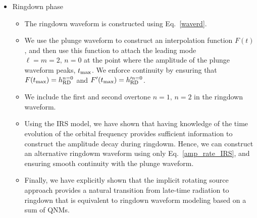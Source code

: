 \documentclass[aps,prd,showpacs,amssymb,floatfix,nofootinbib,superscriptaddress]{revtex4-1}%
\begin{document}
\begin{itemize}
\item{Ringdown phase}
\begin{itemize}
\item The ringdown waveform is constructed using Eq.~\eqref{waverd}.
\item We use the plunge waveform to construct an interpolation function \(F(t)\), and then use this function to attach the leading mode \(\ell=m=2,\, n=0\) at the point where the amplitude of the plunge waveform peaks, \(t_{\rm{max}}\). We enforce continuity by ensuring that \(F( t_{\rm{max}}) = h^{n=0}_{\rm{RD}}\) and  \(F'( t_{\rm{max}}) = h'^{n=0}_{\rm{RD}}\).
\item We include the first and second overtone \(n=1,\, n=2\) in the ringdown waveform.
\item  Using the IRS model, we have shown that having knowledge of the time evolution of the orbital frequency provides sufficient information to construct the amplitude decay during ringdowm. Hence, we can construct an alternative ringdowm waveform using only Eq.~\eqref{amp_rate_IRS}, and ensuring smooth continuity with the plunge waveform. 
\item Finally, we have explicitly shown that the implicit rotating source approach provides a natural transition from late-time radiation to ringdown that is equivalent to ringdown waveform modeling based on a sum of QNMs.
\end{itemize}
\end{itemize}
\end{document}
